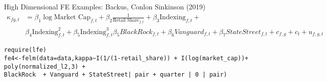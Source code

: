 \documentclass[aspectratio=169]{beamer}
\begin{document}
\begin{frame}[fragile]{High Dimensional FE Examples: Backus, Conlon Sinkinson (2019)}
\footnotesize
\begin{align*}
\kappa_{fg,t} &= \beta_1 \log \text{Market Cap}_{f,t} + \beta_2\frac{1}{\text{Retail Share}_{f,t}} + \beta_3\text{Indexing}_{f,t} +\\
&\beta_4 \text{Indexing}_{f,t}^2 + \beta_5 \text{Indexing}_{f,t}^3 \beta_5 BlackRock_{f,t} + \beta_6 Vanguard_{f,t} + \beta_7 StateStreet_{f,t} 
 + c_{f,g} + c_t + u_{f,g,t}
\end{align*}

\tiny
\begin{verbatim}
require(lfe)
fe4<-felm(data=data,kappa~I(1/(1-retail_share)) + I(log(market_cap))+ poly(normalized_l2,3) + 
BlackRock  + Vanguard + StateStreet| pair + quarter | 0 | pair)
\end{verbatim}
\end{frame}
\end{document}
